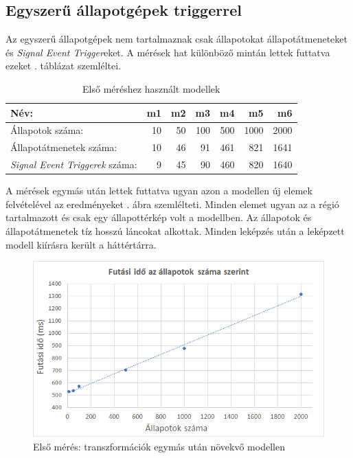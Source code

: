 \subsection{Egyszerű állapotgépek triggerrel}

Az egyszerű állapotgépek nem tartalmaznak csak állapotokat állapotátmeneteket és \emph{Signal Event Trigger}eket. A mérések hat különböző mintán lettek futtatva ezeket . táblázat szemléltei.

\begin{table}[H]
	\footnotesize
	\centering
	\begin{tabular}{ l r r r r r r}
		Név: & m1 & m2 & m3 & m4 & m5 & m6 \\ \hline
		Állapotok száma:  & 10 & 50 & 100 & 500 & 1000 & 2000 \\
		Állapotátmenetek száma: & 10 & 46 & 91 & 461 & 821 & 1641 \\
		\emph{Signal Event Triggerek} száma: & 9 & 45 & 90 & 460 & 820 & 1640
	\end{tabular}
	\caption{Első méréshez használt modellek}
	\label{table:meres1}
\end{table}

A mérések egymás után lettek futtatva ugyan azon a modellen új elemek felvételével az eredményeket . ábra szemlélteti. Minden elemet ugyan az a régió tartalmazott és csak egy állapottérkép volt a modellben. Az állapotok és állapotátmenetek tíz hosszú láncokat alkottak. Minden leképzés után a leképzett modell kiírásra került a háttértárra.

\begin{figure}[H]
	\centering
	\includegraphics[keepaspectratio, width=150mm]{figures/meres1.png}
	\caption{Első mérés: transzformációk egymás után növekvő modellen}
	\label{fig:meres1}
\end{figure}

